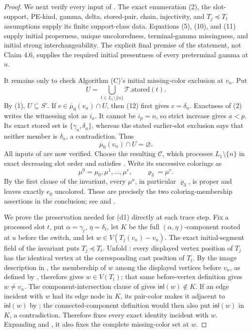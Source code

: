\begin{proof}
We next verify every input of .  The
exact enumeration (2), the slot-support, PE-kind, gamma, delta, stored-pair,
chain, injectivity, and \(T_j\preccurlyeq T_t\) assumptions supply its
finite support-class data.  Equations (5), (10), and (11) supply initial
properness, unique uncoloredness, terminal-gamma missingness, and initial
strong interchangeability.  The explicit final premise of the statement,
not Claim 4.6, supplies the required initial presentness of every
preterminal gamma at \(u\).

It remains only to check Algorithm (C)'s initial missing-color exclusion at
\(v_n\).  Put
\[
 U=\bigcup_{t\in L_1\setminus\{n\}}
       \mathcal T.\mathrm{stored}(t).
\]
By (1), \(U\subseteq S'\).  If
\(c\in\overline\mu_0(v_n)\cap U\), then (12) first gives
\(c=\delta_n\).  Exactness of (2) writes the witnessing slot as \(i_a\).
It cannot be \(i_p=n\), so strict increase gives \(a<p\).  Its exact stored
set is \(\{\gamma_a,\delta_a\}\), whereas the stated earlier-slot
exclusion says that neither member is \(\delta_n\), a contradiction.
Thus
\[
                         \overline\mu_0(v_n)\cap U=\varnothing.       \tag{14}
\]
All inputs of  are now verified.  Choose
the resulting  \(\mathcal C\),
which processes \(L_1\setminus\{n\}\) in exact decreasing slot order and
satisfies .  Write its successive
colorings as
\[
 \mu^0=\mu_0,\mu^1,\ldots,\mu^r,\qquad
 \varrho_3=\mu^r.                                                   \tag{15}
\]
By the first clause of the invariant, every \(\mu^a\), in particular
\(\varrho_3\), is proper and leaves exactly \(e_0\) uncolored.  These are
precisely the two coloring-membership assertions in the conclusion; see
 and .

We prove the preservation needed for (d1) directly at each trace step.
Fix a processed slot \(t\), put
\(\alpha=\gamma_t\), \(\eta=\delta_t\), let \(K\) be the full
\((\alpha,\eta)\)-component rooted at \(u\) before the switch, and let
\(w\in V(T_j(v_n)-v_n)\).  The exact initial-segment field of the invariant
puts \(T_j\preccurlyeq T_t\).  Unfold
: every displayed vertex position of
\(T_j\) has the identical vertex at the corresponding cast position of
\(T_t\).  By the image description in
, the membership of \(w\) among the
displayed vertices before \(v_n\), as defined by
, therefore gives \(w\in V(T_t)\); that same
before-vertex definition gives \(w\ne v_n\).
The component-intersection clause of
 gives
\(\mathsf{inl}(w)\notin K\).  If an edge incident with \(w\) had its edge
node in \(K\), its pair-color makes it adjacent to \(\mathsf{inl}(w)\)
by ; the connected-component definition
 would then also put \(\mathsf{inl}(w)\) in
\(K\), a contradiction.  Therefore
 fixes every exact identity incident with
\(w\).  Expanding  and , it
also fixes the complete missing-color set at \(w\).


\end{proof}

